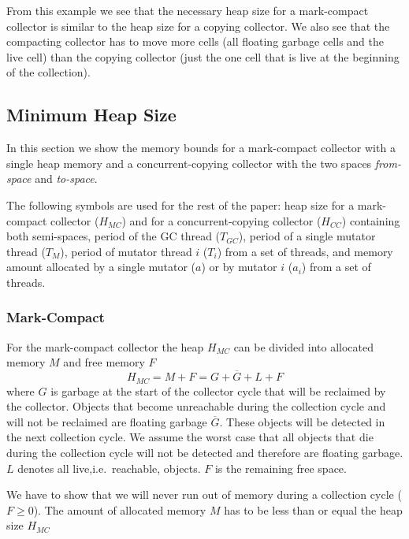 From this example we see that the necessary heap size for a
mark-compact collector is similar to the heap size for a copying
collector. We also see that the compacting collector has to move
more cells (all floating garbage cells and the live cell) than the
copying collector (just the one cell that is live at the beginning
of the collection).


\subsection{Minimum Heap Size} \label{sec:min:heap}

In this section we show the memory bounds for a mark-compact
collector with a single heap memory and a concurrent-copying
collector with the two spaces \emph{from-space} and \emph{to-space}.

The following symbols are used for the rest of the paper: heap size
for a mark-compact collector ($H_{MC}$) and for a concurrent-copying
collector ($H_{CC}$) containing both semi-spaces, period of the GC
thread ($T_{GC}$), period of a single mutator thread ($T_M$), period
of mutator thread $i$ ($T_i$) from a set of threads, and memory
amount allocated by a single mutator ($a$) or by mutator $i$ ($a_i$)
from a set of threads.

\subsubsection{Mark-Compact} \label{sec:gcsched:mc}

For the mark-compact collector the heap $H_{MC}$ can be divided into
allocated memory $M$ and free memory $F$
%
\begin{equation}\label{equ:mcheap}
    H_{MC} = M + F = G + \overline{G} + L + F
\end{equation}
%
where $G$ is garbage at the start of the collector cycle that will
be reclaimed by the collector. Objects that become unreachable
during the collection cycle and will not be reclaimed are floating
garbage $\overline{G}$. These objects will be detected in the next
collection cycle. We assume the worst case that all objects that die
during the collection cycle will not be detected and therefore are
floating garbage. $L$ denotes all live,i.e.\  reachable, objects.
$F$ is the remaining free space.

We have to show that we will never run out of memory during a
collection cycle ($F\ge0$). The amount of allocated memory $M$ has
to be less than or equal the heap size $H_{MC}$

